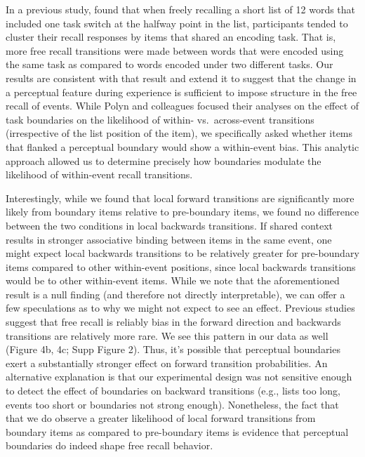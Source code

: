 In a previous study, \autocite{polyn_context_2009} found that when
freely recalling a short list of 12 words that included one task switch
at the halfway point in the list, participants tended to cluster their
recall responses by items that shared an encoding task. That is, more
free recall transitions were made between words that were encoded using
the same task as compared to words encoded under two different tasks.
Our results are consistent with that result and extend it to suggest
that the change in a perceptual feature during experience is sufficient
to impose structure in the free recall of events. While Polyn and
colleagues focused their analyses on the effect of task boundaries on
the likelihood of within- vs.~across-event transitions (irrespective of
the list position of the item), we specifically asked whether items that
flanked a perceptual boundary would show a within-event bias. This
analytic approach allowed us to determine precisely how boundaries
modulate the likelihood of within-event recall transitions.

Interestingly, while we found that local forward transitions are
significantly more likely from boundary items relative to pre-boundary
items, we found no difference between the two conditions in local
backwards transitions. If shared context results in stronger associative
binding between items in the same event, one might expect local
backwards transitions to be relatively greater for pre-boundary items
compared to other within-event positions, since local backwards
transitions would be to other within-event items. While we note that the
aforementioned result is a null finding (and therefore not directly
interpretable), we can offer a few speculations as to why we might not
expect to see an effect. Previous studies suggest that free recall is
reliably bias in the forward direction
\autocites{kahana_associative_1996}{howard_distributed_2002} and
backwards transitions are relatively more rare. We see this pattern in
our data as well (Figure 4b, 4c; Supp Figure 2). Thus, it's possible
that perceptual boundaries exert a substantially stronger effect on
forward transition probabilities. An alternative explanation is that our
experimental design was not sensitive enough to detect the effect of
boundaries on backward transitions (e.g., lists too long, events too
short or boundaries not strong enough). Nonetheless, the fact that that
we do observe a greater likelihood of local forward transitions from
boundary items as compared to pre-boundary items is evidence that
perceptual boundaries do indeed shape free recall behavior.

